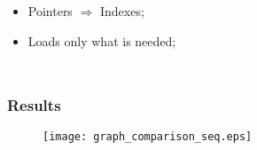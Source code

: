 \begin{frame}
\begin{columns}
			\smaller
			\begin{table}
				\captionsetup[subfloat]{position=top,labelformat=empty}
				\;
				\;
				\;
				\subfloat[\ldots]{}
			\end{table}
			\larger

			\begin{itemize}
				\item Pointers $\Rightarrow$ Indexes;
				\item Loads only what is needed;
			\end{itemize}
	\end{columns}
\end{frame}


\begin{frame}
	\frametitle{Results}
	\begin{figure}
		\centering
		\texttt{[image: graph\_comparison\_seq.eps]}
	\end{figure}
\end{frame}


